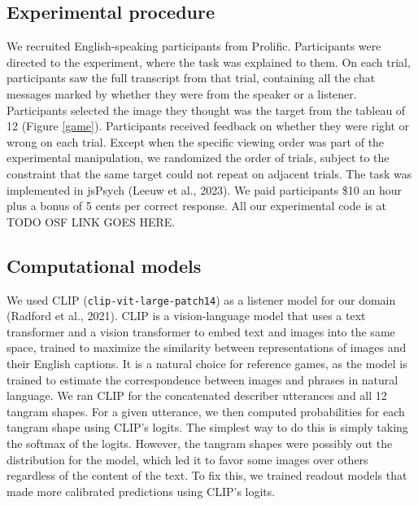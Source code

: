 \documentclass[10pt, letterpaper]{article}
\begin{document}
\subsection{Experimental procedure}\label{experimental-procedure}

We recruited English-speaking participants from Prolific. Participants
were directed to the experiment, where the task was explained to them.
On each trial, participants saw the full transcript from that trial,
containing all the chat messages marked by whether they were from the
speaker or a listener. Participants selected the image they thought was
the target from the tableau of 12 (Figure \ref{game}). Participants
received feedback on whether they were right or wrong on each trial.
Except when the specific viewing order was part of the experimental
manipulation, we randomized the order of trials, subject to the
constraint that the same target could not repeat on adjacent trials. The
task was implemented in jsPsych (Leeuw et al., 2023). We paid
participants \$10 an hour plus a bonus of 5 cents per correct response.
All our experimental code is at TODO OSF LINK GOES HERE.

\subsection{Computational models}\label{computational-models}

We used CLIP (\texttt{clip-vit-large-patch14}) as a listener model for
our domain (Radford et al., 2021). CLIP is a vision-language model that
uses a text transformer and a vision transformer to embed text and
images into the same space, trained to maximize the similarity between
representations of images and their English captions. It is a natural
choice for reference games, as the model is trained to estimate the
correspondence between images and phrases in natural language. We ran
CLIP for the concatenated describer utterances and all 12 tangram
shapes. For a given utterance, we then computed probabilities for each
tangram shape using CLIP's logits. The simplest way to do this is simply
taking the softmax of the logits. However, the tangram shapes were
possibly out the distribution for the model, which led it to favor some
images over others regardless of the content of the text. To fix this,
we trained readout models that made more calibrated predictions using
CLIP's logits.
\end{document}

